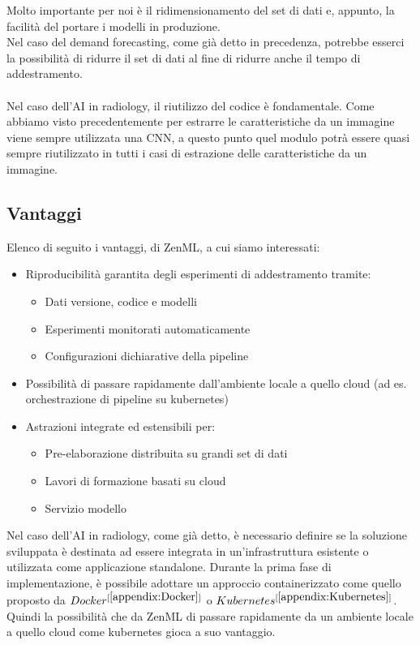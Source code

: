 \documentclass[12pt,a4paper]{report}
\begin{document}
Molto importante per noi è il ridimensionamento del set di dati e, appunto, la facilità del portare i modelli in produzione.\\
Nel caso del demand forecasting, come già detto in precedenza, potrebbe esserci la possibilità di ridurre il set di dati al fine di ridurre anche il tempo di addestramento.\\
\\
Nel caso dell'AI in radiology, il riutilizzo del codice è fondamentale. Come abbiamo visto precedentemente per estrarre le caratteristiche da un immagine viene sempre utilizzata una CNN, a questo punto quel modulo potrà essere quasi sempre riutilizzato in tutti i casi di estrazione delle caratteristiche da un immagine.\\

\subsection{Vantaggi}
Elenco di seguito i vantaggi, di ZenML, a cui siamo interessati:
\begin{itemize}
    \item Riproducibilità garantita degli esperimenti di addestramento tramite:
    \begin{itemize}
        \item Dati versione, codice e modelli
        \item Esperimenti monitorati automaticamente
        \item Configurazioni dichiarative della pipeline
    \end{itemize}
    \item Possibilità di passare rapidamente dall'ambiente locale a quello cloud (ad es. orchestrazione di pipeline su kubernetes)
    \item Astrazioni integrate ed estensibili per:
    \begin{itemize}
        \item Pre-elaborazione distribuita su grandi set di dati
        \item Lavori di formazione basati su cloud        
        \item Servizio modello
    \end{itemize}
\end{itemize}
Nel caso dell'AI in radiology, come già detto, è necessario definire se la soluzione sviluppata è destinata ad essere integrata in un'infrastruttura esistente o utilizzata come applicazione standalone. Durante la prima fase di implementazione, è possibile adottare un approccio containerizzato come quello proposto da $Docker^{[\ref{appendix:Docker}]}$ o $Kubernetes^{[\ref{appendix:Kubernetes}]}$.\\
Quindi la possibilità che da ZenML di passare rapidamente da un ambiente locale a quello cloud come kubernetes gioca a suo vantaggio.
\end{document}
